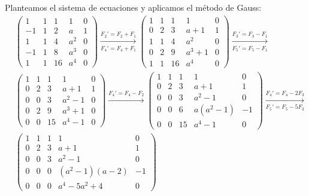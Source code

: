 \begin{ejercicio}
\begin{enumerate}
        Planteamos el sistema de ecuaciones y aplicamos el método de Gauss:
        \begin{align*}
            &\left(\begin{array}{cccc|c}
                1 & 1 & 1 & 1 & 0 \\
                -1 & 1 & 2 & a & 1 \\
                1 & 1 & 4 & a^2 & 0 \\
                -1 & 1 & 8 & a^3 & 0 \\
                1 & 1 & 16 & a^4 & 0
            \end{array}\right) \xrightarrow[F_4'=F_4+F_1]{F_2'=F_2+F_1}
            \left(\begin{array}{cccc|c}
                1 & 1 & 1 & 1 & 0 \\
                0 & 2 & 3 & a+1 & 1 \\
                1 & 1 & 4 & a^2 & 0 \\
                0 & 2 & 9 & a^3+1 & 0 \\
                1 & 1 & 16 & a^4 & 0
            \end{array}\right)\xrightarrow[F_5'=F_5-F_1]{F_3'=F_3-F_1}
            \\&\left(\begin{array}{cccc|c}
                1 & 1 & 1 & 1 & 0 \\
                0 & 2 & 3 & a+1 & 1 \\
                0 & 0 & 3 & a^2-1 & 0 \\
                0 & 2 & 9 & a^3+1 & 0 \\
                0 & 0 & 15 & a^4-1 & 0
            \end{array}\right)\xrightarrow{F_4'=F_4-F_2}
            \left(\begin{array}{cccc|c}
                1 & 1 & 1 & 1 & 0 \\
                0 & 2 & 3 & a+1 & 1 \\
                0 & 0 & 3 & a^2-1 & 0 \\
                0 & 0 & 6 & a(a^2-1) & -1 \\
                0 & 0 & 15 & a^4-1 & 0
            \end{array}\right)\xrightarrow[F_5'=F_5-5F_3]{F_4'=F_4-2F_3}
            \\&\left(\begin{array}{cccc|c}
                1 & 1 & 1 & 1 & 0 \\
                0 & 2 & 3 & a+1 & 1 \\
                0 & 0 & 3 & a^2-1 & 0 \\
                0 & 0 & 0 & (a^2-1)(a-2) & -1 \\
                0 & 0 & 0 & a^4-5a^2+4 & 0
            \end{array}\right)
        \end{align*}


\end{enumerate}
\end{ejercicio}

